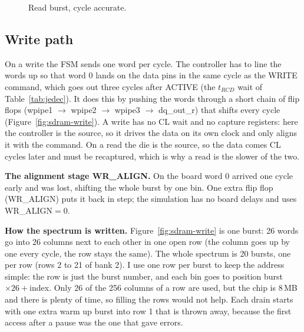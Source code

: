 \documentclass[a4paper,10pt]{article}
\newcommand{\wbus}[4]{%
  \draw[line width=0.6pt, fill=white]
    ({#1+0.06},{#3+0.17}) -- ({#2-0.06},{#3+0.17}) -- (#2,#3) -- ({#2-0.06},{#3-0.17})
    -- ({#1+0.06},{#3-0.17}) -- (#1,#3) -- cycle;
  \node[font=\tiny] at ({(#1+#2)/2},#3) {#4};}
\newcommand{\widle}[3]{\draw[line width=0.6pt] (#1,#3) -- (#2,#3);}
\newcommand{\wcut}[3]{%
  \draw[line width=0.5pt, fill=white] ({#1-0.10},#2) -- ({#1+0.10},#2) --
       ({#1+0.22},#3) -- ({#1+0.02},#3) -- cycle;
  \draw[line width=0.7pt] ({#1-0.10},#2) -- ({#1+0.02},#3);
  \draw[line width=0.7pt] ({#1+0.10},#2) -- ({#1+0.22},#3);}
\begin{document}
\begin{figure}[H]
\caption{Read burst, cycle accurate.}
\label{fig:sdram-read}
\end{figure}

\subsection{Write path}
\label{sec:sdram-write}

On a write the FSM sends one word per cycle. The controller has to line the words up so that
word 0 lands on the data pins in the same cycle as the WRITE command, which
goes out three cycles after ACTIVE (the $t_{RCD}$ wait of Table~\ref{tab:jedec}). It does this by pushing the words through a
short chain of flip flops (wpipe1 $\to$ wpipe2 $\to$
wpipe3 $\to$ dq\_out\_r) that shifts every cycle
(Figure~\ref{fig:sdram-write}). A write has no CL wait and no capture registers: here
the controller is the source, so it drives the data on its own clock and only aligns it
with the command. On a read the die is the source, so the data comes CL cycles later and
must be recaptured, which is why a read is the slower of the two.

\textbf{The alignment stage WR\_ALIGN.} On the board word 0 arrived one cycle
early and was lost, shifting the whole burst by one bin. One extra flip flop
(WR\_ALIGN) puts it back in step; the simulation has no board delays and uses
WR\_ALIGN$=0$.

\textbf{How the spectrum is written.} Figure~\ref{fig:sdram-write} is one burst: 26 words
go into 26 columns next to each other in one open row (the column goes up by one every
cycle, the row stays the same). The whole spectrum is 20 bursts, one per row (rows 2 to 21
of bank 2). I use one row per burst to keep the address simple: the row is just the burst
number, and each bin goes to position burst$\times26+$index. Only 26 of the 256
columns of a row are used, but the chip is 8\,MB and there is plenty of time, so filling
the rows would not help. Each drain starts with one extra warm up burst into row 1 that is
thrown away, because the first access after a pause was the one that gave errors.
\end{document}
